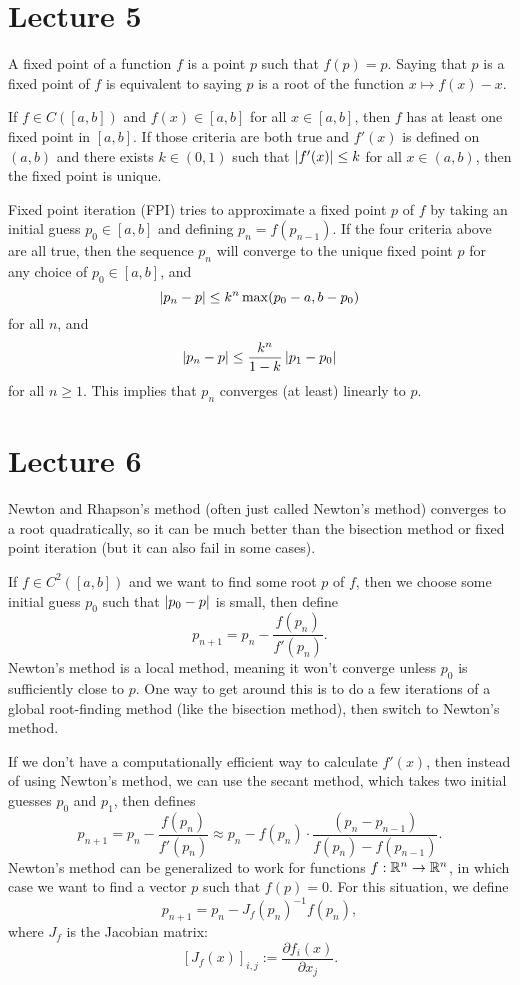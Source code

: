 \documentclass{article}
\begin{document}
\section{Lecture 5}
A fixed point of a function $f$ is a point $p$ such that $f(p)=p$. Saying that $p$ is a fixed point of $f$ is equivalent to saying $p$ is a root of the function $x \mapsto f(x)-x$.
\par
If $f \in C([a,b])$ and $f(x) \in [a,b]$ for all $x \in [a,b]$, then $f$ has at least one fixed point in $[a,b]$. If those criteria are both true and $f'(x)$ is defined on $(a,b)$ and there exists $k \in (0,1)$ such that $\left\lvert f'(x) \right\rvert \leq k$ for all $x \in (a,b)$, then the fixed point is unique.
\par
Fixed point iteration (FPI) tries to approximate a fixed point $p$ of $f$ by taking an initial guess $p_0 \in [a,b]$ and defining $p_n=f(p_{n-1})$. If the four criteria above are all true, then the sequence $p_n$ will converge to the unique fixed point $p$ for any choice of $p_0 \in [a,b]$, and
\[ \left\lvert p_n-p \right\rvert \leq k^n \max(p_0-a, b-p_0) \]
for all $n$, and
\[ \left\lvert p_n-p \right\rvert \leq \frac{k^n}{1-k} \left\lvert p_1-p_0 \right\rvert \]
for all $n \geq 1$. This implies that $p_n$ converges (at least) linearly to $p$.

\section{Lecture 6}
Newton and Rhapson's method (often just called Newton's method) converges to a root quadratically, so it can be much better than the bisection method or fixed point iteration (but it can also fail in some cases).
\par
If $f \in C^2([a,b])$ and we want to find some root $p$ of $f$, then we choose some initial guess $p_0$ such that $\left\lvert p_0 - p \right\rvert$ is small, then define
\[ p_{n+1} = p_n - \frac{f(p_n)}{f'(p_n)}. \]
Newton's method is a local method, meaning it won't converge unless $p_0$ is sufficiently close to $p$. One way to get around this is to do a few iterations of a global root-finding method (like the bisection method), then switch to Newton's method.
\par
If we don't have a computationally efficient way to calculate $f'(x)$, then instead of using Newton's method, we can use the secant method, which takes two initial guesses $p_0$ and $p_1$, then defines
\[ p_{n+1} = p_n - \frac{f(p_n)}{f'(p_n)} \approx p_n - f(p_n) \cdot \frac{(p_n-p_{n-1})}{f(p_n)-f(p_{n-1})}. \]
Newton's method can be generalized to work for functions $f: \mathbb{R}^n \rightarrow \mathbb{R}^n$, in which case we want to find a vector $p$ such that $f(p)=0$. For this situation, we define
\[ p_{n+1}=p_n - J_f(p_n)^{-1}f(p_n), \]
where $J_f$ is the Jacobian matrix:
\[ \left[ J_f(x) \right]_{i,j} := \frac{\partial f_i(x)}{\partial x_j}. \]
\end{document}
